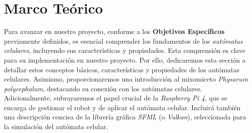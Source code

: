 \section{Marco Te\'orico}
\label{sec:marco_teorico}
    Para avanzar en nuestro proyecto, conforme a los \textbf{Objetivos Espec\'ificos} previamente definidos, 
        es esencial comprender los fundamentos de los \textit{aut\'omatas celulares}, incluyendo sus caracter\'isticas 
        y propiedades. Esta comprensi\'on es clave para su implementaci\'on en nuestro proyecto. Por ello, dedicaremos 
        esta secci\'on a detallar estos conceptos b\'asicos, caracter\'isticas y propiedades de los aut\'omatas celulares. 
        Asimismo, proporcionaremos una introducci\'on al mixomiceto \textit{Physarum polycephalum}, destacando su conexi\'on 
        con los aut\'omatas celulares.
    \vskip 0.5cm
    Adicionalmente, subrayaremos el papel crucial de la \textit{Raspberry Pi 4}, 
        que se encarga de gestionar el robot y de aplicar el aut\'omata celular. Incluir\'a 
        tambi\'en una descripci\'on concisa de la librer\'ia gr\'afica \textit{SFML} (o \textit{Vulkan}), 
        seleccionada para la simulaci\'on del aut\'omata celular.

    
    
    
    
    
